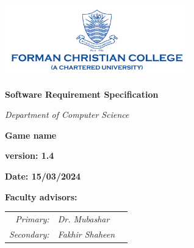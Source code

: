 
\begin{titlepage}
    \centering
    \vspace*{0.5cm}
    \includegraphics[width=0.6\textwidth]{./images/fcc_logo} %
    \vspace{2.5cm}

    {\LARGE\bfseries Software Requirement Specification\par}
    \vspace{0.5cm}
    {\Large\itshape Department of Computer Science\par}
    \vspace{2.5cm}
    {\ProjectTitle\bfseries Game name\par}
    \vspace{3.5cm}
    {\large\bfseries version: 1.4\par}
    \vspace{0.5cm}
    {\large\bfseries Date: 15/03/2024\par}
    
    \newpage
    
    \vspace*{\fill}

    \begin{center}
        {\Large\bfseries Faculty advisors:\par}

        \vspace{3em} %
        
        \begin{center}
        \begin{tabular}{r l c}
            \textit{Primary:} & \textit{Dr. Mubashar} & \raisebox{-1.0ex}{\rule{4cm}{.4pt}} \\[1cm]
            \textit{Secondary:} & \textit{Fakhir Shaheen} & \raisebox{-1.0ex}{\rule{4cm}{.4pt}} \\
        \end{tabular}
        \end{center}
    
        \vspace{3cm}
    

\end{center}
\end{titlepage}
